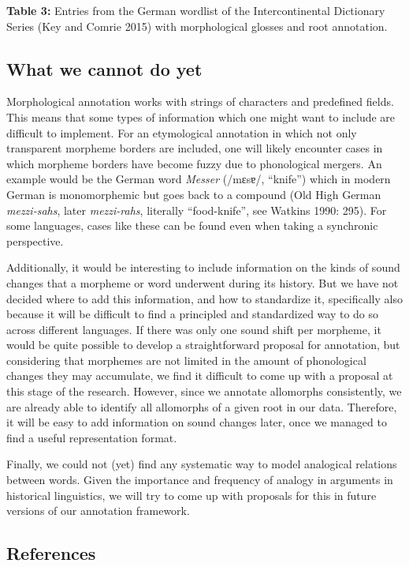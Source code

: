 \documentclass[
  english,
  a4paper,
  oneside,tablecaptionabove
]{scrbook}
\begin{document}
\textbf{Table 3:} Entries from the German wordlist of the
Intercontinental Dictionary Series (Key and Comrie 2015) with
morphological glosses and root annotation.

\hypertarget{what-we-cannot-do-yet}{%
\subsection{What we cannot do yet}\label{what-we-cannot-do-yet}}

Morphological annotation works with strings of characters and predefined
fields. This means that some types of information which one might want
to include are difficult to implement. For an etymological annotation in
which not only transparent morpheme borders are included, one will
likely encounter cases in which morpheme borders have become fuzzy due
to phonological mergers. An example would be the German word
\emph{Messer} (/mɛsɐ/, \enquote{knife}) which in modern German is
monomorphemic but goes back to a compound (Old High German
\emph{mezzi-sahs}, later \emph{mezzi-rahs}, literally
\enquote{food-knife}, see Watkins 1990: 295). For some languages, cases
like these can be found even when taking a synchronic perspective.

Additionally, it would be interesting to include information on the
kinds of sound changes that a morpheme or word underwent during its
history. But we have not decided where to add this information, and how
to standardize it, specifically also because it will be difficult to
find a principled and standardized way to do so across different
languages. If there was only one sound shift per morpheme, it would be
quite possible to develop a straightforward proposal for annotation, but
considering that morphemes are not limited in the amount of phonological
changes they may accumulate, we find it difficult to come up with a
proposal at this stage of the research. However, since we annotate
allomorphs consistently, we are already able to identify all allomorphs
of a given root in our data. Therefore, it will be easy to add
information on sound changes later, once we managed to find a useful
representation format.

Finally, we could not (yet) find any systematic way to model analogical
relations between words. Given the importance and frequency of analogy
in arguments in historical linguistics, we will try to come up with
proposals for this in future versions of our annotation framework.

\hypertarget{references}{\subsection*{References}\label{references}}
\end{document}
